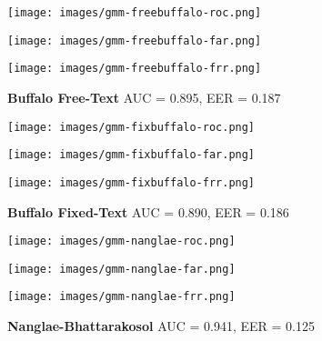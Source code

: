 \begin{figure}[H]
    \centering
    \texttt{[image: images/gmm-freebuffalo-roc.png]}
\end{figure}
\begin{figure}[H]
    \centering
    \begin{minipage}{0.49\textwidth} %
        \centering
        \texttt{[image: images/gmm-freebuffalo-far.png]}
    \end{minipage}
    \hfill
    \begin{minipage}{0.49\textwidth} %
        \centering
        \texttt{[image: images/gmm-freebuffalo-frr.png]}
    \end{minipage}
    \caption{\textbf{Buffalo Free-Text } AUC = 0.895, EER = 0.187}
\end{figure}

\begin{figure}[H]
    \centering
    \texttt{[image: images/gmm-fixbuffalo-roc.png]}
\end{figure}
\begin{figure}[H]
    \centering
    \begin{minipage}{0.49\textwidth} %
        \centering
        \texttt{[image: images/gmm-fixbuffalo-far.png]}
    \end{minipage}
    \hfill
    \begin{minipage}{0.49\textwidth} %
        \centering
        \texttt{[image: images/gmm-fixbuffalo-frr.png]}
    \end{minipage}
    \caption{\textbf{Buffalo Fixed-Text } AUC = 0.890, EER = 0.186}
\end{figure}

\begin{figure}[H]
    \centering
    \texttt{[image: images/gmm-nanglae-roc.png]}
\end{figure}
\begin{figure}[H]
    \centering
    \begin{minipage}{0.49\textwidth} %
        \centering
        \texttt{[image: images/gmm-nanglae-far.png]}
    \end{minipage}
    \hfill
    \begin{minipage}{0.49\textwidth} %
        \centering
        \texttt{[image: images/gmm-nanglae-frr.png]}
    \end{minipage}
    \caption{\textbf{Nanglae-Bhattarakosol } AUC = 0.941, EER = 0.125}
\end{figure}
\FloatBarrier
